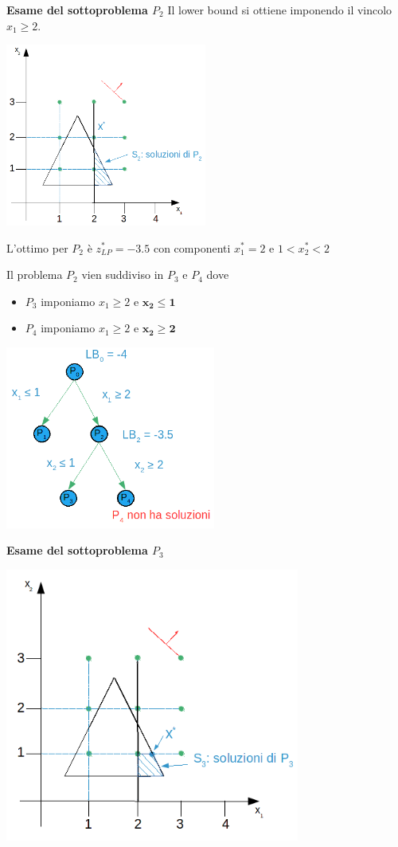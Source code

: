 \textbf{Esame del sottoproblema $P_{2}$}\newline
Il lower bound si ottiene imponendo il vincolo $x_{1}\ge 2$.

\centerline{\includegraphics[height=6cm]{images/graph21.png}}
L'ottimo per $P_{2}$ è $z_{LP}^{*}=-3.5$ con componenti $x_{1}^{*}=2$ e $1<x_{2}^{*}<2$

Il problema $P_{2}$ vien suddiviso in $P_{3}$ e $P_{4}$ dove
\begin{itemize}
	\item $P_{3}$ imponiamo $x_{1}\ge 2$ e \underline{$\boldsymbol{x_{2}\le 1}$}
	\item $P_{4}$ imponiamo $x_{1}\ge 2$ e \underline{$\boldsymbol{x_{2}\ge 2}$}
\end{itemize}

\centerline{\includegraphics[height=6cm]{images/graph22.png}}

\textbf{Esame del sottoproblema $P_{3}$}

\centerline{\includegraphics[height=9cm]{images/graph23.png}}

